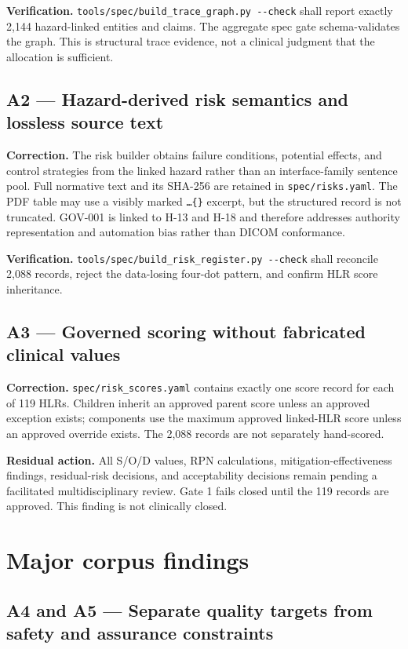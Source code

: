 \documentclass[11pt,letterpaper]{article}
\begin{document}
\textbf{Verification.} \nolinkurl{tools/spec/build_trace_graph.py --check} shall report exactly 2,144 hazard-linked entities and claims. The aggregate spec gate schema-validates the graph. This is structural trace evidence, not a clinical judgment that the allocation is sufficient.

\subsection{A2 --- Hazard-derived risk semantics and lossless source text}

\textbf{Correction.} The risk builder obtains failure conditions, potential effects, and control strategies from the linked hazard rather than an interface-family sentence pool. Full normative text and its SHA-256 are retained in \nolinkurl{spec/risks.yaml}. The PDF table may use a visibly marked \texttt{\string\ldots\{\}} excerpt, but the structured record is not truncated. GOV-001 is linked to H-13 and H-18 and therefore addresses authority representation and automation bias rather than DICOM conformance.

\textbf{Verification.} \nolinkurl{tools/spec/build_risk_register.py --check} shall reconcile 2,088 records, reject the data-losing four-dot pattern, and confirm HLR score inheritance.

\subsection{A3 --- Governed scoring without fabricated clinical values}

\textbf{Correction.} \nolinkurl{spec/risk_scores.yaml} contains exactly one score record for each of 119 HLRs. Children inherit an approved parent score unless an approved exception exists; components use the maximum approved linked-HLR score unless an approved override exists. The 2,088 records are not separately hand-scored.

\textbf{Residual action.} All S/O/D values, RPN calculations, mitigation-effectiveness findings, residual-risk decisions, and acceptability decisions remain pending a facilitated multidisciplinary review. Gate 1 fails closed until the 119 records are approved. This finding is not clinically closed.

\section{Major corpus findings}

\subsection{A4 and A5 --- Separate quality targets from safety and assurance constraints}
\end{document}
